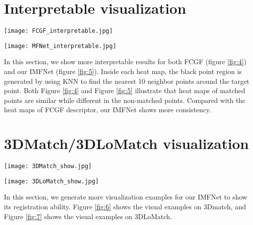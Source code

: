 \documentclass[10pt,twocolumn,letterpaper]{article}
\begin{document}
\section{Interpretable visualization}
\label{7}
\begin{figure*}[htp]
	\centering
	\texttt{[image: FCGF\_interpretable.jpg]}
	\caption{Interpretable results of FCGF. Points \textbf{p} and \textbf{q} are matched, and \textbf{p} and \textbf{q'} are non-matched.}
	\label{fig:4}
\end{figure*}
\begin{figure*}[htp]
	\centering
	\texttt{[image: MFNet\_interpretable.jpg]}
	\caption{Interpretable results of our IMFNet. Points \textbf{p} and \textbf{q} are matched, and \textbf{p} and \textbf{q'} are non-matched.}
	\label{fig:5}
\end{figure*}
In this section, we show more interpretable results for both FCGF (figure \ref{fig:4}) and our IMFNet (figure \ref{fig:5}). Inside each heat map, the black point region is generated by using KNN to find the nearest 10 neighbor points around the target point. Both Figure \ref{fig:4} and Figure \ref{fig:5} illustrate that heat maps of matched points are similar while different in the non-matched points.  Compared with the heat maps of FCGF descriptor, our IMFNet shows more consistency.


\section{3DMatch/3DLoMatch visualization}
\label{8}

\begin{figure*}[htp]
	\centering
	\texttt{[image: 3DMatch\_show.jpg]}
	\caption{Some visualization results of IMFNet on 3DMatch.}
	\label{fig:6}
\end{figure*}

\begin{figure*}[htp]
	\centering
	\texttt{[image: 3DLoMatch\_show.jpg]}
	\caption{Some visualization results of IMFNet on 3DLoMatch.}
	\label{fig:7}
\end{figure*}
In this section, we generate more visualization examples for our IMFNet to show its registration ability. Figure \ref{fig:6} shows the visual examples on 3Dmatch, and Figure \ref{fig:7} shows the visual examples on 3DLoMatch.
\end{document}
